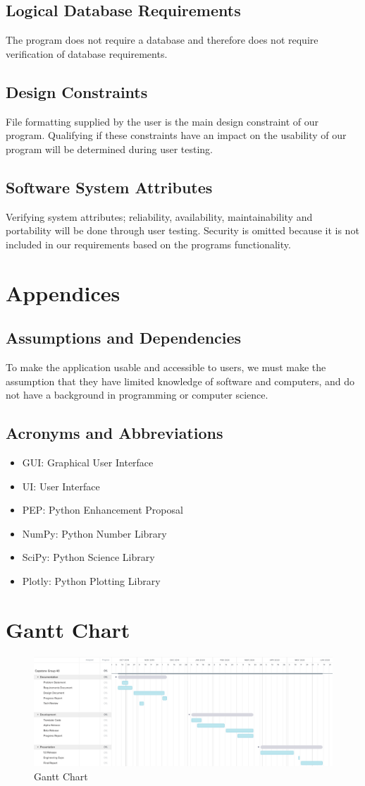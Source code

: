 \documentclass[draftclsnofoot,onecolumn,letterpaper,10pt,compsoc]{IEEEtran}
\begin{document}
\subsection{Logical Database Requirements}
The program does not require a database and therefore does not require verification of database requirements.

\subsection{Design Constraints}
File formatting supplied by the user is the main design constraint of our program. Qualifying if these constraints have an impact on the usability of our program will be determined during user testing.

\subsection{Software System Attributes}
Verifying system attributes; reliability, availability, maintainability and portability will be done through user testing. Security is omitted because it is not included in our requirements based on the programs functionality.

\section{Appendices}
\subsection{Assumptions and Dependencies}
To make the application usable and accessible to users, we must make the assumption that they have limited knowledge of software and computers, and do not have a background in programming or computer science.

\subsection{Acronyms and Abbreviations}
\begin{itemize}
    \item GUI: Graphical User Interface
    \item UI: User Interface
    \item PEP: Python Enhancement Proposal 
    \item NumPy: Python Number Library
    \item SciPy: Python Science Library
    \item Plotly: Python Plotting Library
\end{itemize}
\pagebreak

\section{Gantt Chart}
\begin{figure}[htp]
    \centering
    \includegraphics[width=17.5cm]{gantt-chart.png}
    \caption{Gantt Chart}
    \label{fig:galaxy}
\end{figure}
\end{document}
